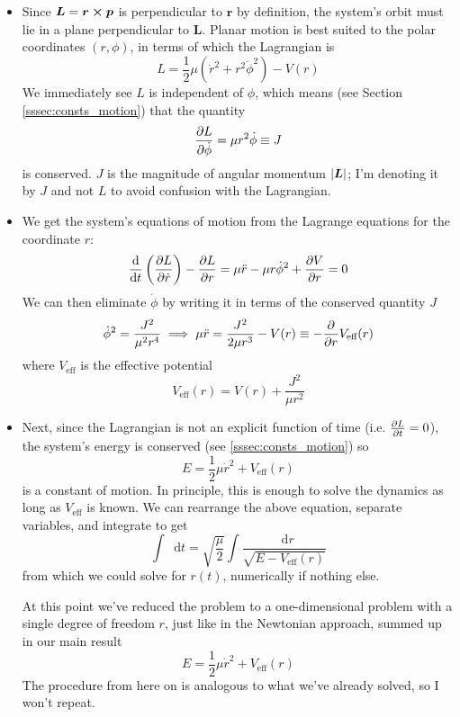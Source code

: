 \documentclass[11pt, a4paper]{article}
\newcommand{\diff}{\mathop{}\!\mathrm{d}} %
\newcommand{\veff}{V_{\text{eff}}}  %
\begin{document}
\begin{itemize}
	\item Since $ \bm{L} = \bm{r} \cross \bm{p}  $ is perpendicular to $ \bm{r} $ by definition, the system's orbit must lie in a plane perpendicular to $ \bm{L} $. Planar motion is best suited to the polar coordinates $ (r, \phi) $, in terms of which the Lagrangian is
	\begin{equation*}
		L = \frac{1}{2} \mu \left(\dot{r}^{2} + r^{2} \dot{\phi}^{2}\right) - V(r)
	\end{equation*}
	We immediately see $ L $ is independent of $ \phi $, which means (see Section \ref{sssec:consts_motion}) that the quantity 
	\begin{equation*}
		\pdv{L}{\dot{\phi}} = \mu r^{2} \dot{\phi} \equiv J
	\end{equation*}
	is conserved. $ J $ is the magnitude of angular momentum $ \abs{\bm{L}} $; I'm denoting it by $ J $ and not $ L $ to avoid confusion with the Lagrangian.
	
	\item We get the system's equations of motion from the Lagrange equations for the coordinate $ r $:
	\begin{equation*}
		\dv{}{t}\left(\pdv{L}{\dot{r}}\right) - \pdv{L}{r} = \mu \ddot{r} - \mu r \dot{\phi}^{2} + \pdv{V}{r} = 0
	\end{equation*}
	We can then eliminate $ \dot{\phi} $ by writing it in terms of the conserved quantity $ J $
	\begin{equation*}
		\dot{\phi}^{2} = \frac{J^{2}}{\mu^{2} r^{4}} \implies \mu \ddot{r} = \frac{J^{2}}{2 \mu r^{3}} - V(r) \equiv - \pdv{}{r} \veff(r)
	\end{equation*}
	where $ \veff $ is the effective potential
	\begin{equation*}
		\veff(r) = V(r) + \frac{J^{2}}{\mu r^{2}}
	\end{equation*}
	
	\item Next, since the Lagrangian is not an explicit function of time (i.e. $ \pdv{L}{t} = 0 $), the system's energy is conserved (see \ref{sssec:consts_motion}) so
	\begin{equation*}
		E = \frac{1}{2}\mu \dot{r}^{2} + \veff(r)
	\end{equation*}
	is a constant of motion. In principle, this is enough to solve the dynamics as long as $ \veff $ is known. We can rearrange the above equation, separate variables, and integrate to get
	\begin{equation*}
		\int \diff t = \sqrt{\frac{\mu}{2}} \int \frac{\diff r}{\sqrt{E - \veff(r)}}
	\end{equation*}
	from which we could solve for $ r(t) $, numerically if nothing else. 
	
	At this point we've reduced the problem to a one-dimensional problem with a single degree of freedom $ r $, just like in the Newtonian approach, summed up in our main result
	\begin{equation*}
				E = \frac{1}{2}\mu \dot{r}^{2} + \veff(r)
	\end{equation*}
	The procedure from here on is analogous to what we've already solved, so I won't repeat.
	
\end{itemize}
\end{document}
